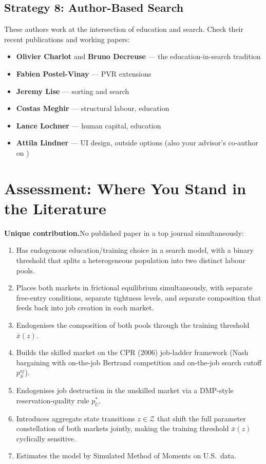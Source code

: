 \documentclass[12pt]{article}
\begin{document}
\subsection{Strategy 8: Author-Based Search}

These authors work at the intersection of education and search. Check their recent publications and working papers:
\begin{itemize}
    \item \textbf{Olivier Charlot} and \textbf{Bruno Decreuse} --- the education-in-search tradition
    \item \textbf{Fabien Postel-Vinay} --- PVR extensions
    \item \textbf{Jeremy Lise} --- sorting and search
    \item \textbf{Costas Meghir} --- structural labour, education
    \item \textbf{Lance Lochner} --- human capital, education
    \item \textbf{Attila Lindner} --- UI design, outside options (also your advisor's co-author on \citet{lindner2020})
\end{itemize}


\section{Assessment: Where You Stand in the Literature}

\textbf{Unique contribution.}\quad No published paper in a top journal simultaneously:
\begin{enumerate}
    \item Has endogenous education/training choice in a search model, with a binary threshold that splits a heterogeneous population into two distinct labour pools.
    \item Places both markets in frictional equilibrium simultaneously, with separate free-entry conditions, separate tightness levels, and separate composition that feeds back into job creation in each market.
    \item Endogenises the composition of both pools through the training threshold $\bar{x}(z)$.
    \item Builds the skilled market on the CPR (2006) job-ladder framework (Nash bargaining with on-the-job Bertrand competition and on-the-job search cutoff $p_S^{oj}$).
    \item Endogenises job destruction in the unskilled market via a DMP-style reservation-quality rule $p_U^*$.
    \item Introduces aggregate state transitions $z \in \mathcal{Z}$ that shift the full parameter constellation of both markets jointly, making the training threshold $\bar{x}(z)$ cyclically sensitive.
    \item Estimates the model by Simulated Method of Moments on U.S.\ data.
\end{enumerate}
\end{document}
